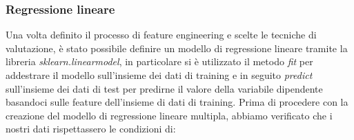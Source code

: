 \subsubsection{Regressione lineare}
\fancyhead{}    %
\label{paragrafo 4.2.1}
Una volta definito il processo di feature engineering e scelte le tecniche di valutazione, è
stato possibile definire un modello di regressione lineare tramite la libreria \textit{sklearn.linearmodel},
in particolare si è utilizzato il metodo \textit{fit} per addestrare il modello sull’insieme dei dati di
training e in seguito \textit{predict} sull’insieme dei dati di test per predirne il valore della variabile
dipendente basandoci sulle feature dell’insieme di dati di training.
Prima di procedere con la creazione del modello di regressione lineare multipla, abbiamo
verificato che i nostri dati rispettassero le condizioni di:
